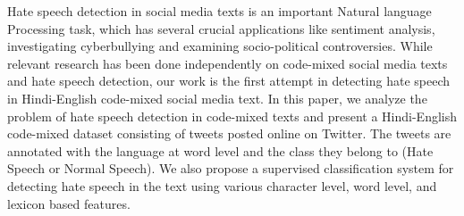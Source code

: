 Hate speech detection in social media texts is an important Natural language Processing task, which has several crucial applications like sentiment analysis, investigating cyberbullying and examining socio-political controversies. While relevant research has been done independently on code-mixed social media texts and hate speech detection, our work is the first attempt in detecting hate speech in Hindi-English code-mixed social media text. In this paper, we analyze the problem of hate speech detection in code-mixed texts and present a Hindi-English code-mixed dataset consisting of tweets posted online on Twitter. The tweets are annotated with the language at word level and the class they belong to (Hate Speech or Normal Speech). We also propose a supervised classification system for detecting hate speech in the text using various character level, word level, and lexicon based features.
